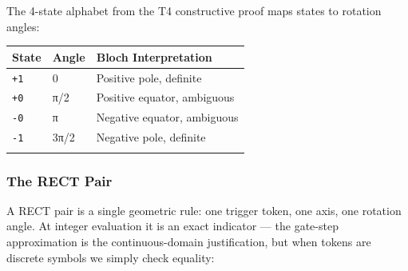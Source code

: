 \documentclass[
  twocolumn,
  10pt,
  a4paper]{article}
\newenvironment{tsxtable}{\begin{center}\footnotesize}{\end{center}}
\let\endhead\relax
\begin{document}
The 4-state alphabet from the T4 constructive proof maps states to
rotation angles:

\begin{tsxtable}\begin{tabularx}{\linewidth}{@{}YYY@{}}
\toprule\noalign{}
State & Angle & Bloch Interpretation \\
\midrule\noalign{}
\endhead
\texttt{\textquotesingle{}+1\textquotesingle{}} & 0 & Positive pole,
definite \\
\texttt{\textquotesingle{}+0\textquotesingle{}} & π/2 & Positive
equator, ambiguous \\
\texttt{\textquotesingle{}-0\textquotesingle{}} & π & Negative equator,
ambiguous \\
\texttt{\textquotesingle{}-1\textquotesingle{}} & 3π/2 & Negative pole,
definite \\
\bottomrule\noalign{}
\end{tabularx}\end{tsxtable}

\hypertarget{the-rect-pair}{%
\subsubsection{The RECT Pair}\label{the-rect-pair}}

A RECT pair is a single geometric rule: one trigger token, one axis, one
rotation angle. At integer evaluation it is an exact indicator --- the
gate-step approximation is the continuous-domain justification, but when
tokens are discrete symbols we simply check equality:
\end{document}

